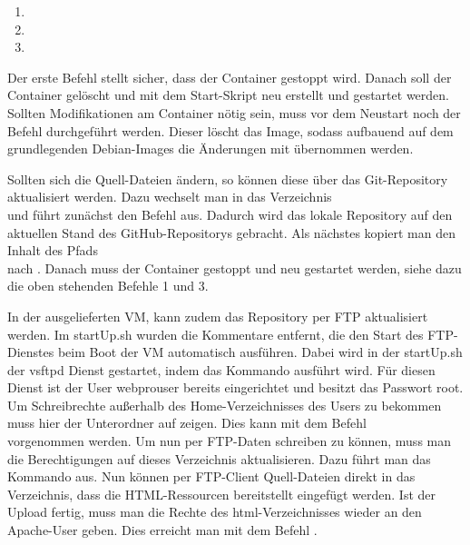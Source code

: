 \begin{enumerate}
	\item {}
	\item {}
	\item {}
\end{enumerate}

Der erste Befehl stellt sicher, dass der Container gestoppt wird. Danach soll der Container gelöscht und mit dem Start-Skript neu erstellt und gestartet werden. Sollten Modifikationen am Container nötig sein, muss vor dem Neustart noch der Befehl  durchgeführt werden. Dieser löscht das Image, sodass aufbauend auf dem grundlegenden Debian-Images die Änderungen mit übernommen werden.\medskip

Sollten sich die Quell-Dateien ändern, so können diese über das Git-Repository aktualisiert werden. Dazu wechselt man in das Verzeichnis\\  und führt zunächst den Befehl  aus. Dadurch wird das lokale Repository auf den aktuellen Stand des GitHub-Repositorys gebracht. Als nächstes kopiert man den Inhalt des Pfads \\  nach . Danach muss der Container gestoppt und neu gestartet werden, siehe dazu die oben stehenden Befehle 1 und 3.\medskip

In der ausgelieferten VM, kann zudem das Repository per FTP aktualisiert werden. Im startUp.sh wurden die Kommentare entfernt, die den Start des FTP-Dienstes beim Boot der VM automatisch ausführen. Dabei wird in der startUp.sh der vsftpd Dienst gestartet, indem das Kommando  ausführt wird. Für diesen Dienst ist der User webprouser bereits eingerichtet und besitzt das Passwort root. Um Schreibrechte außerhalb des Home-Verzeichnisses des Users zu bekommen muss hier der Unterordner  auf  zeigen. Dies kann mit dem Befehl\\  vorgenommen werden. Um nun per FTP-Daten schreiben zu können, muss man die Berechtigungen auf dieses Verzeichnis aktualisieren. Dazu führt man das Kommando  aus. Nun können per FTP-Client Quell-Dateien direkt in das Verzeichnis, dass die HTML-Ressourcen bereitstellt eingefügt werden. Ist der Upload fertig, muss man die Rechte des html-Verzeichnisses wieder an den Apache-User geben. Dies erreicht man mit dem Befehl .